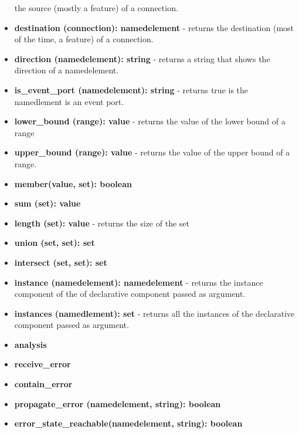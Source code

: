 \documentclass[times, 10pt]{article}
\begin{document}
\begin{itemize}
        the source (mostly a feature) of a connection.
    \item
        \textbf{destination (connection): namedelement} - returns
        the destination (most of the time, a feature) of a connection.
    \item
        \textbf{direction (namedelement): string} - returns a string
        that shows the direction of a namedelement.
    \item
        \textbf{is\_event\_port (namedelement): string} - returns
        true is the namedlement is an event port.
    \item
        \textbf{lower\_bound (range): value} - returns
        the value of the lower bound of a range
    \item
        \textbf{upper\_bound (range): value} - returns the value
        of the upper bound of a range.
    \item
        \textbf{member(value, set): boolean}
    \item
        \textbf{sum (set): value}
    \item
        \textbf{length (set): value} - returns the size of the set
    \item
        \textbf{union (set, set): set}
    \item
        \textbf{intersect (set, set): set}
    \item
        \textbf{instance (namedelement): namedelement} - returns the instance
        component of the of declarative component passed as argument.
    \item
        \textbf{instances (namedlement): set} - returns all
        the instances of the declarative component passed as argument.
    \item
        \textbf{analysis}
    \item
        \textbf{receive\_error}
    \item
        \textbf{contain\_error}
    \item
        \textbf{propagate\_error (namedelement, string): boolean}
    \item
        \textbf{error\_state\_reachable(namedelement, string): boolean}
\end{itemize}
\end{document}
